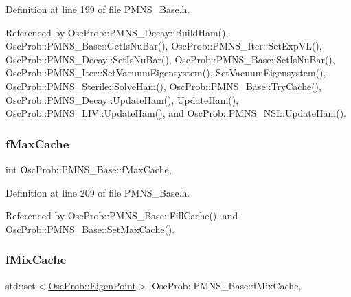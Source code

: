 Definition at line 199 of file P\+M\+N\+S\+\_\+\+Base.\+h.



Referenced by Osc\+Prob\+::\+P\+M\+N\+S\+\_\+\+Decay\+::\+Build\+Ham(), Osc\+Prob\+::\+P\+M\+N\+S\+\_\+\+Base\+::\+Get\+Is\+Nu\+Bar(), Osc\+Prob\+::\+P\+M\+N\+S\+\_\+\+Iter\+::\+Set\+Exp\+V\+L(), Osc\+Prob\+::\+P\+M\+N\+S\+\_\+\+Decay\+::\+Set\+Is\+Nu\+Bar(), Osc\+Prob\+::\+P\+M\+N\+S\+\_\+\+Base\+::\+Set\+Is\+Nu\+Bar(), Osc\+Prob\+::\+P\+M\+N\+S\+\_\+\+Iter\+::\+Set\+Vacuum\+Eigensystem(), Set\+Vacuum\+Eigensystem(), Osc\+Prob\+::\+P\+M\+N\+S\+\_\+\+Sterile\+::\+Solve\+Ham(), Osc\+Prob\+::\+P\+M\+N\+S\+\_\+\+Base\+::\+Try\+Cache(), Osc\+Prob\+::\+P\+M\+N\+S\+\_\+\+Decay\+::\+Update\+Ham(), Update\+Ham(), Osc\+Prob\+::\+P\+M\+N\+S\+\_\+\+L\+I\+V\+::\+Update\+Ham(), and Osc\+Prob\+::\+P\+M\+N\+S\+\_\+\+N\+S\+I\+::\+Update\+Ham().

\mbox{\label{classOscProb_1_1PMNS__Base_a74c13356eafec2490d8c3c19759ba7f0}} 
\subsubsection{\texorpdfstring{f\+Max\+Cache}{fMaxCache}}
{\footnotesize\ttfamily int Osc\+Prob\+::\+P\+M\+N\+S\+\_\+\+Base\+::f\+Max\+Cache\hspace{0.3cm}{\ttfamily [protected]}, {\ttfamily [inherited]}}



Definition at line 209 of file P\+M\+N\+S\+\_\+\+Base.\+h.



Referenced by Osc\+Prob\+::\+P\+M\+N\+S\+\_\+\+Base\+::\+Fill\+Cache(), and Osc\+Prob\+::\+P\+M\+N\+S\+\_\+\+Base\+::\+Set\+Max\+Cache().

\mbox{\label{classOscProb_1_1PMNS__Base_a8159424f20197a3a7145fe3bf2c11176}} 
\subsubsection{\texorpdfstring{f\+Mix\+Cache}{fMixCache}}
{\footnotesize\ttfamily std\+::set$<$\hyperlink{structOscProb_1_1EigenPoint}{Osc\+Prob\+::\+Eigen\+Point}$>$ Osc\+Prob\+::\+P\+M\+N\+S\+\_\+\+Base\+::f\+Mix\+Cache\hspace{0.3cm}{\ttfamily [protected]}, {\ttfamily [inherited]}}



